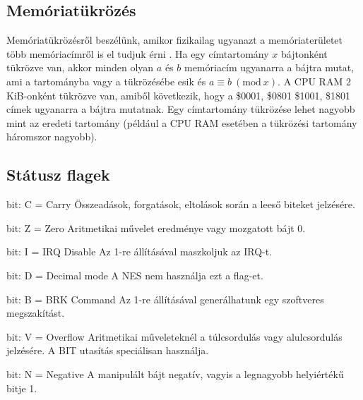 \subsection{Memóriatükrözés}
Memóriatükrözésről beszélünk, amikor fizikailag ugyanazt a memóriaterületet több memóriacímről is el tudjuk érni \cite{memmirror}. Ha egy címtartomány $x$ bájtonként tükrözve van, akkor minden olyan $a$ és $b$ memóriacím ugyanarra a bájtra mutat, ami a tartományba vagy a tükrözésébe esik és $a \equiv b\ (\textrm{mod}\ x)$.  A CPU RAM 2 KiB-onként tükrözve van, amiből következik, hogy a \$0001, \$0801 \$1001, \$1801 címek ugyanarra a bájtra mutatnak. Egy címtartomány tükrözése lehet nagyobb mint az eredeti tartomány (például a CPU RAM esetében a tükrözési tartomány háromszor nagyobb).

\subsection{Státusz flagek}

\begin{compactenum}
	\setcounter{enumi}{-1}
	\item bit: C = Carry \newline Összeadások, forgatások, eltolások során a leeső biteket jelzésére.
	\item bit: Z = Zero   \newline Aritmetikai művelet eredménye vagy mozgatott bájt 0.
	\item bit: I = IRQ Disable
	\newline Az 1-re állításával maszkoljuk az IRQ-t.
	\item bit: D = Decimal mode
	\newline
	A NES nem használja ezt a flag-et.
	\item bit: B = BRK Command
	\newline Az 1-re állításával generálhatunk egy szoftveres megszakítást. 
	\setcounter{enumi}{5}
	\item bit: V = Overflow
	\newline 
	Aritmetikai műveleteknél a túlcsordulás vagy alulcsordulás jelzésére.
	A BIT utasítás speciálisan használja.
	\item bit: N = Negative
	\newline A manipulált bájt negatív, vagyis a legnagyobb helyiértékű bitje 1.
\end{compactenum}


